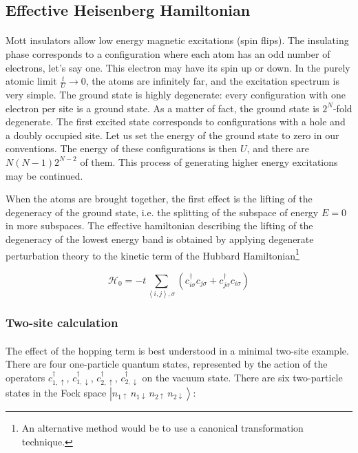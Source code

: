 \documentclass[10pt, twocolumn, twoside]{article}
\begin{document}
\subsection{Effective Heisenberg Hamiltonian}\paragraph{}

Mott insulators allow low energy magnetic excitations (spin flips). The insulating phase corresponds to a configuration where each atom has an odd number of electrons, let's say one. This electron may have its spin up or down. In the purely atomic limit $\frac{t}{U} \rightarrow 0$, the atoms are infinitely far, and the excitation spectrum is very simple. The ground state is highly degenerate: every configuration with one electron per site is a ground state. As a matter of fact, the ground state is $2^N$-fold degenerate. The first excited state corresponds to configurations with a hole and a doubly occupied site. Let us set the energy of the ground state to zero in our conventions.  The energy of these configurations is then $U$, and there are $N(N-1)2^{N-2}$ of them. This process of generating higher energy excitations may be continued.

When the atoms are brought together, the first effect is the lifting of the degeneracy of the ground state, i.e. the splitting of the subspace of energy $E = 0$ in more subspaces. The effective hamiltonian describing the lifting of the degeneracy of the lowest energy band is obtained by applying degenerate perturbation theory \cite{Mila2007} to the kinetic term of the Hubbard Hamiltonian\footnote{An alternative method would be to use a canonical transformation technique.}

\begin{equation}
\mathcal{H}_0 = - t \sum_{\left\langle i, j \right\rangle, \sigma} ( c_{i\sigma}^\dagger c_{j\sigma} + c_{j\sigma}^\dagger c_{i\sigma} ) 
\end{equation}

\subsubsection{Two-site calculation}\paragraph{}

The effect of the hopping term is best understood in a minimal two-site example. There are four one-particle quantum states, represented by the action of the operators $c_{1,\uparrow}^\dagger$, $c_{1,\downarrow}^\dagger$, $c_{2,\uparrow}^\dagger$, $c_{2,\downarrow}^\dagger$ on the vacuum state. There are six two-particle states in the Fock space $\left| n_{1\uparrow} \,  n_{1\downarrow} \,  n_{2\uparrow} \, n_{2\downarrow} \right\rangle$:
\end{document}
